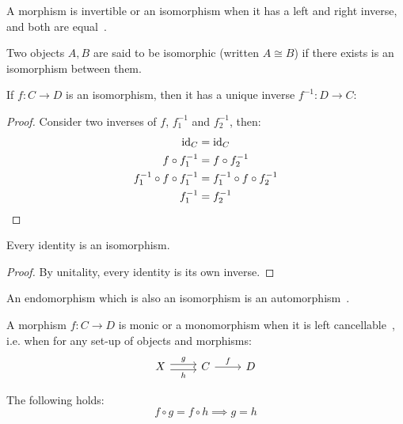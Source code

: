 \begin{definition}[Isomorphism]
  A morphism is invertible or an isomorphism when it has a left and right
  inverse, and both are equal~\parencite[p.~19]{lane:working_mathematician}.
\end{definition}

\begin{remark}
  Two objects $A, B$ are said to be isomorphic (written $A\cong B$) if there
  exists is an isomorphism between them.
\end{remark}

\begin{theorem}
  If $f: C\to D$ is an isomorphism, then it has a unique inverse $f^{-1}:D\to
  C$:
  \begin{proof}
    Consider two inverses of $f$, $f^{-1}_1$ and $f^{-1}_2$, then:
    \[
      \begin{aligned}
        \mathrm{id}_C &= \mathrm{id}_C\\
        f\circ f^{-1}_1 &= f\circ f^{-1}_2\\
        f^{-1}_1 \circ f \circ f^{-1}_1 &= f^{-1}_1 \circ f \circ f^{-1}_2\\
        f^{-1}_1 &= f^{-1}_2
      \end{aligned}
    \]
  \end{proof}
  \vspace{-\baselineskip}
\end{theorem}

\begin{theorem}
  Every identity is an isomorphism.

  \begin{proof}
    By unitality, every identity is its own inverse.
  \end{proof}
\end{theorem}

\begin{definition}[Automorphism]
  An endomorphism which is also an isomorphism is an
  automorphism~\parencite[p.~7]{riehl:category_theory_in_context}.
\end{definition}

\begin{definition}[Monomorphisms]
  A morphism $f:C\to D$ is monic or a monomorphism when it is left
  cancellable~\parencite[p.~19]{lane:working_mathematician}, i.e. when for any
  set-up of objects and morphisms:
  \[\begin{tikzcd}[ampersand replacement=\&]
    X \& C \& D
    \arrow["f", from=1-2, to=1-3]
    \arrow["g", shift left=1, from=1-1, to=1-2]
    \arrow["h"', shift right=1, from=1-1, to=1-2]
  \end{tikzcd}\]

  The following holds:
  \[f \circ g = f \circ h \implies g = h\]
\end{definition}


